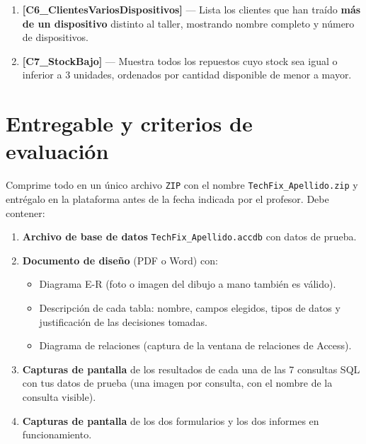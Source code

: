 \documentclass[12pt,a4paper]{article}
\begin{document}
\begin{consultabox}
\begin{enumerate}[label=\bfseries C\arabic*.]
  \item \textbf{[C6\_ClientesVariosDispositivos]} —
        Lista los clientes que han traído \textbf{más de un dispositivo} distinto al taller,
        mostrando nombre completo y número de dispositivos.

  \item \textbf{[C7\_StockBajo]} —
        Muestra todos los repuestos cuyo stock sea igual o inferior a 3 unidades,
        ordenados por cantidad disponible de menor a mayor.

\end{enumerate}
\end{consultabox}

\vspace{0.4cm}

\section{Entregable y criterios de evaluación}

\begin{entregabox}
Comprime todo en un único archivo \texttt{ZIP} con el nombre \texttt{TechFix\_Apellido.zip}
y entrégalo en la plataforma antes de la fecha indicada por el profesor. Debe contener:

\begin{enumerate}
  \item \textbf{Archivo de base de datos} \texttt{TechFix\_Apellido.accdb} con datos de prueba.
  \item \textbf{Documento de diseño} (PDF o Word) con:
    \begin{itemize}
      \item Diagrama E-R (foto o imagen del dibujo a mano también es válido).
      \item Descripción de cada tabla: nombre, campos elegidos, tipos de datos y justificación
            de las decisiones tomadas.
      \item Diagrama de relaciones (captura de la ventana de relaciones de Access).
    \end{itemize}
  \item \textbf{Capturas de pantalla} de los resultados de cada una de las 7 consultas SQL
        con tus datos de prueba (una imagen por consulta, con el nombre de la consulta visible).
  \item \textbf{Capturas de pantalla} de los dos formularios y los dos informes en funcionamiento.
\end{enumerate}
\end{entregabox}
\end{document}
